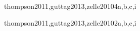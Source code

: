 \begin{syllabus}
\begin{unit}{\PLObjectOrientedProgrammingDef}{thompson2011,guttag2013,zelle2010}{4}{a,b,c,i}
    \begin{topics}%
	\item \PLObjectOrientedProgrammingTopicClasses%
	\item \PLObjectOrientedProgrammingTopicPolymorphism%
	\item \PLObjectOrientedProgrammingTopicClasshierarchies%
    \end{topics}%

    \begin{unitgoals}%
	\item \PLObjectOrientedProgrammingObjFOUR%
	\item \PLObjectOrientedProgrammingObjFIVE%
    \end{unitgoals}%
\end{unit}

\begin{unit}{\SEUsingAPIsDef}{thompson2011,guttag2013,zelle2010}{2}{a,b,c,i}
   \begin{topics}
      \item \SEUsingAPIsTopicProgramming
   \end{topics}

   \begin{unitgoals}
      \item \SEUsingAPIsObjONE
   \end{unitgoals}
\end{unit}



\begin{coursebibliography}
\end{coursebibliography}

\end{syllabus}
